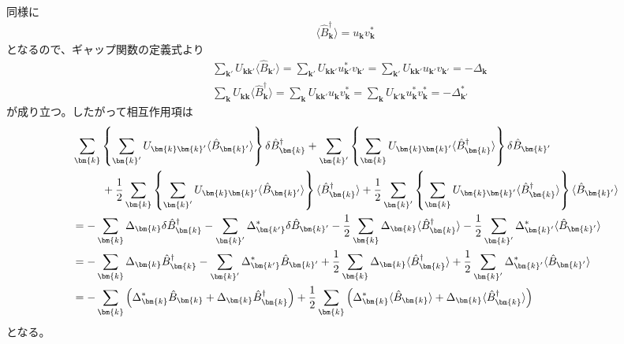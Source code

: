 \documentclass[dvipdfmx, 11pt, a4paper]{jsarticle}
\numberwithin{equation}{section}
\theoremstyle{definition}
\begin{document}
\begin{derivationBox}
\begin{align}
        \end{align}
        同様に
        \begin{align}
            \langle \hat{B}_{\bm{k}}^\dagger \rangle = u_{\bm{k}}v_{\bm{k}}^* 
        \end{align}
        となるので、ギャップ関数の定義式より
        \begin{align}
            &\sum_{\bm{k}'} U_{\bm{k}\bm{k}'}\langle \hat{B}_{\bm{k}'} \rangle = \sum_{\bm{k}'} U_{\bm{k}\bm{k}'} u_{\bm{k}'}^*v_{\bm{k}'} = \sum_{\bm{k}'} U_{\bm{k}\bm{k}'} u_{\bm{k}'}v_{\bm{k}'} = -\Delta_{\bm{k}}  \\
            & \sum_{\bm{k}} U_{\bm{k}\bm{k}}\langle \hat{B}_{\bm{k}}^\dagger \rangle = \sum_{\bm{k}} U_{\bm{k}\bm{k}'} u_{\bm{k}}v_{\bm{k}}^* = \sum_{\bm{k}} U_{\bm{k}'\bm{k}} u_{\bm{k}}^*v_{\bm{k}}^* = -\Delta_{\bm{k}'}^*
        \end{align}
        が成り立つ。したがって相互作用項は
        \begin{align}
            &\sum_{\bm{k}} \left\{ \sum_{\bm{k}'} U_{\bm{k}\bm{k}'}  \langle \hat{B}_{\bm{k}'} \rangle \right\} \delta \hat{B}_{\bm{k}}^\dagger + \sum_{\bm{k}'} \left\{ \sum_{\bm{k}} U_{\bm{k}\bm{k}'}  \langle \hat{B}_{\bm{k}}^\dagger \rangle \right\} \delta \hat{B}_{\bm{k}'} \notag \\
            &\ \ \ \ \ \ \ \ + \frac{1}{2}\sum_{\bm{k}} \left\{ \sum_{\bm{k}'} U_{\bm{k}\bm{k}'}  \langle \hat{B}_{\bm{k}'} \rangle \right\} \langle \hat{B}_{\bm{k}}^\dagger \rangle + \frac{1}{2}\sum_{\bm{k}'} \left\{ \sum_{\bm{k}} U_{\bm{k}\bm{k}'}\langle \hat{B}_{\bm{k}}^\dagger \rangle \right\}  \langle \hat{B}_{\bm{k}'} \rangle \notag \\
            &= -\sum_{\bm{k}} \Delta_{\bm{k}} \delta \hat{B}_{\bm{k}}^\dagger - \sum_{\bm{k}'} \Delta_{\bm{k'}}^* \delta \hat{B}_{\bm{k}'} - \frac{1}{2}\sum_{\bm{k}} \Delta_{\bm{k}} \langle \hat{B}_{\bm{k}}^\dagger \rangle - \frac{1}{2}\sum_{\bm{k}'} \Delta_{\bm{k}'}^*  \langle \hat{B}_{\bm{k}'} \rangle \notag \\ 
            &= -\sum_{\bm{k}} \Delta_{\bm{k}}  \hat{B}_{\bm{k}}^\dagger - \sum_{\bm{k}'} \Delta_{\bm{k'}}^*  \hat{B}_{\bm{k}'} + \frac{1}{2}\sum_{\bm{k}} \Delta_{\bm{k}} \langle \hat{B}_{\bm{k}}^\dagger \rangle + \frac{1}{2}\sum_{\bm{k}'} \Delta_{\bm{k}'}^*  \langle \hat{B}_{\bm{k}'} \rangle \notag \\
            &= -\sum_{\bm{k}}\left( \Delta_{\bm{k}}^*  \hat{B}_{\bm{k}}+\Delta_{\bm{k}}  \hat{B}_{\bm{k}}^\dagger \right) + \frac{1}{2}\sum_{\bm{k}} \left( \Delta_{\bm{k}}^*  \langle \hat{B}_{\bm{k}} \rangle + \Delta_{\bm{k}} \langle \hat{B}_{\bm{k}}^\dagger \rangle \right)
        \end{align}
        となる。
    \end{derivationBox}
\end{document}
